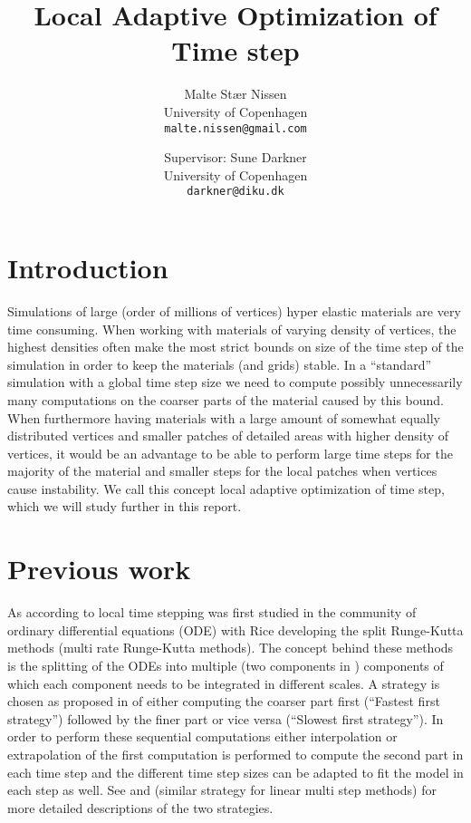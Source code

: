 \documentclass[11pt,a4paper]{article}
\title{Local Adaptive Optimization of Time step}
\author{Malte Stær Nissen\\
        University of Copenhagen\\
        \texttt{malte.nissen@gmail.com} \and
        Supervisor: Sune Darkner\\University of Copenhagen\\\texttt{darkner@diku.dk}}
\begin{document}
\maketitle

\tableofcontents

\clearpage

\section{Introduction}
Simulations of large (order of millions of vertices) hyper elastic materials
are very time consuming. When working with materials of varying density of
vertices, the highest densities often make the most strict bounds on size of
the time step of the simulation in order to keep the materials (and grids)
stable. In a ``standard'' simulation with a global time step size we need
to compute possibly unnecessarily many computations on the coarser parts of
the material caused by this bound. When furthermore having materials with a
large amount of somewhat equally distributed vertices and smaller patches of
detailed areas with higher density of vertices, it would be an advantage to be
able to perform large time steps for the majority of the material and smaller
steps for the local patches when vertices cause instability. We call this
concept local adaptive optimization of time step, which we will study further
in this report.

\section{Previous work}
As according to \cite{Gander:2013} local time stepping was first studied
in the community of ordinary differential equations (ODE) with Rice
\cite{rice:1960} developing the split Runge-Kutta methods (multi rate
Runge-Kutta methods). The concept behind these methods is the splitting of
the ODEs into multiple (two components in \cite{rice:1960}) components of
which each component needs to be integrated in different scales. A strategy
is chosen as proposed in \cite{Kvaernoe:1999} of either computing the coarser
part first (``Fastest first strategy'') followed by the finer part or vice
versa (``Slowest first strategy''). In order to perform these sequential
computations either interpolation or extrapolation of the first computation
is performed to compute the second part in each time step and the different
time step sizes can be adapted to fit the model in each step as well. See
\cite{Kvaernoe:1999} and \cite{Gear:1984} (similar strategy for linear multi
step methods) for more detailed descriptions of the two strategies.
\end{document}
